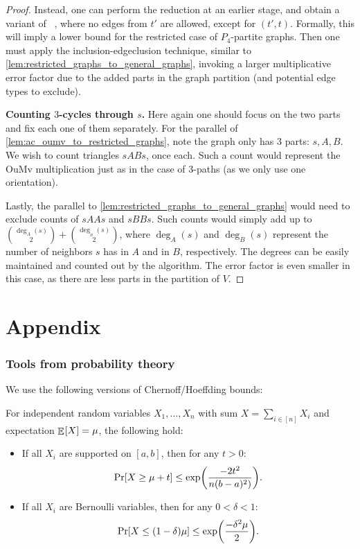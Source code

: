 \documentclass[letter,11pt]{article}
\newcommand{\oumv}{\textnormal{\textsf{OuMv}}\xspace}
\begin{document}
\begin{proof}
Instead, one can perform the reduction at an earlier stage, and obtain a variant of ~, where no edges from $t'$ are allowed, except for $(t',t)$.
Formally, this will imply a lower bound for the restricted case of $P_4$-partite graphs. Then one must apply the inclusion-edgeclusion technique, similar to \cref{lem:restricted_graphs_to_general_graphs}, invoking a larger multiplicative error factor due to the added parts in the graph partition (and potential edge types to exclude).


\noindent\textbf{Counting $3$-cycles through $s$.}
Here again one should focus on the two parts and fix each one of them separately. For the parallel of \cref{lem:ac_oumv_to_restricted_graphs}, note the graph only has $3$ parts: $s, A, B$. We wish to count triangles $sABs$, once each. Such a count would represent the \oumv multiplication just as in the case of $3$-paths (as we only use one orientation).

Lastly, the parallel to \cref{lem:restricted_graphs_to_general_graphs} would need to exclude counts of $sAAs$ and $sBBs$. Such counts would simply add up to $\binom{\deg_A(s)}{2} + \binom{\deg_{_B}(s)}{2}$, where $\deg_A(s)$ and $\deg_B(s)$ represent the number of neighbors $s$ has in $A$ and in $B$, respectively. 
The degrees can be easily maintained and counted out by the algorithm.
The error factor is even smaller in this case, as there are less parts in the partition of $V$.
\end{proof}

\newpage
\part*{Appendix}
\appendix
\section{Tools from probability theory}
\label{sec:tools_from_probability}


We use the following versions of Chernoff/Hoeffding bounds:
\begin{fact}
    \label{fact:Chernoff/Hoefdding}
    For independent random variables $X_1, \dots, X_n$ with sum $X = \sum_{i\in[n]} X_i$ and expectation $\Expc{}{X} = \mu$, the following hold:
    \begin{itemize}
        \item If all $X_i$ are supported on $[a,b]$, then for any $t > 0$:
        \[
            \Prob{}{X \geq \mu + t} \leq \exp\left(\frac{-2t^{2}}{n (b-a)^2)}\right).
        \]

        \item If all $X_i$ are Bernoulli variables, then for any $0 < \delta < 1$:
        \[
            \Prob{}{X \leq (1-\delta)\mu} \leq \exp\left(\frac{-\delta^2 \mu }{2}\right).
        \]
    \end{itemize}
    
\end{fact}
\end{document}
